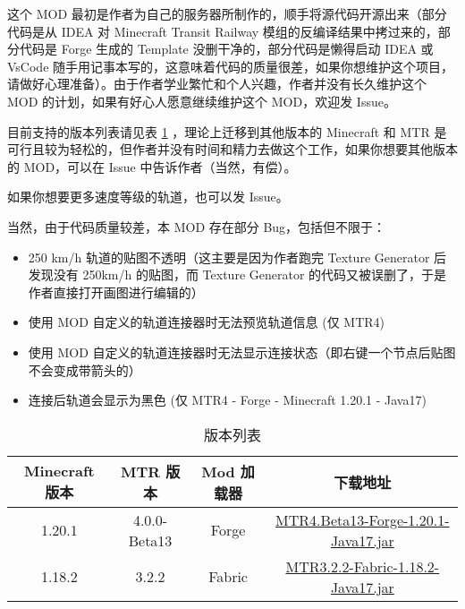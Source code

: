 \documentclass{article}
\begin{document}
这个 MOD 最初是作者为自己的服务器所制作的，顺手将源代码开源出来（部分代码是从 IDEA 对 Minecraft Transit Railway 模组的反编译结果中拷过来的，部分代码是 Forge 生成的 Template 没删干净的，部分代码是懒得启动 IDEA 或 VsCode 随手用记事本写的，这意味着代码的质量很差，如果你想维护这个项目，请做好心理准备）。由于作者学业繁忙和个人兴趣，作者并没有长久维护这个 MOD 的计划，如果有好心人愿意继续维护这个 MOD，欢迎发 Issue。

目前支持的版本列表请见表 \ref{versionTable} ，理论上迁移到其他版本的 Minecraft 和 MTR 是可行且较为轻松的，但作者并没有时间和精力去做这个工作，如果你想要其他版本的 MOD，可以在 Issue 中告诉作者（当然，有偿）。

如果你想要更多速度等级的轨道，也可以发 Issue。

当然，由于代码质量较差，本 MOD 存在部分 Bug，包括但不限于：

\begin{itemize}
    \item 250 km/h 轨道的贴图不透明（这主要是因为作者跑完 Texture Generator 后发现没有 250km/h 的贴图，而 Texture Generator 的代码又被误删了，于是作者直接打开画图进行编辑的）
    \item 使用 MOD 自定义的轨道连接器时无法预览轨道信息 (仅 MTR4)
    \item 使用 MOD 自定义的轨道连接器时无法显示连接状态（即右键一个节点后贴图不会变成带箭头的）
    \item 连接后轨道会显示为黑色 (仅 MTR4 - Forge - Minecraft 1.20.1 - Java17)
\end{itemize}

\begin{table}[!ht]
    \centering
    \label{versionTable}
    \begin{tabular}{c|c|c|c}
        \textbf{Minecraft 版本} & \textbf{MTR 版本} & \textbf{Mod 加载器} & \textbf{下载地址} \\ \hline
        1.20.1 & 4.0.0-Beta13 & Forge & \href{https://github.com/lihugang/mtr-cr-speed-rails/releases/download/MTR4/MTR4.Beta13-Forge-1.20.1-Java17.jar}{MTR4.Beta13-Forge-1.20.1-Java17.jar} \\ 
        1.18.2 & 3.2.2 & Fabric & \href{https://github.com/lihugang/mtr-cr-speed-rails/releases/download/MTR3.2.2/MTR3.2.2-Fabric-1.18.2-Java17.jar}{MTR3.2.2-Fabric-1.18.2-Java17.jar} \\ 
    \end{tabular}
    \caption{版本列表}
\end{table}
\end{document}
